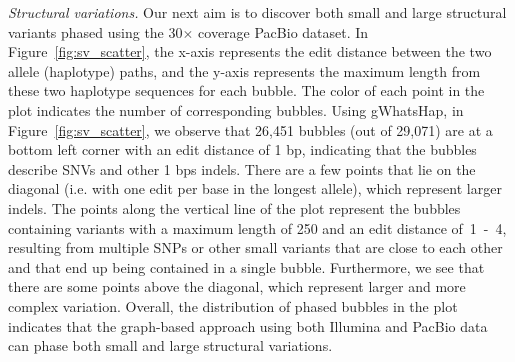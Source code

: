\textit{Structural variations.} Our next aim is to discover both small and large structural variants phased using the 30$\times$ coverage PacBio dataset.
In Figure~\ref{fig:sv_scatter}, the x-axis represents the edit distance between the two allele (haplotype) paths,
and the y-axis represents the maximum length from these two haplotype sequences for each bubble.
The color of each point in the plot indicates the number of corresponding bubbles.
Using gWhatsHap, in Figure~\ref{fig:sv_scatter}, we observe that 26,451 bubbles (out of 29,071) are at a bottom left corner with an edit distance of 1 bp, indicating that the bubbles describe SNVs and other 1 bps indels. 
There are a few points that lie on the diagonal (i.e. with one edit per base in the longest allele), which represent larger indels.
The points along the vertical line of the plot represent the bubbles containing variants with a maximum length of 250 and an edit distance of~1~-~4, 
resulting from multiple SNPs or other small variants that are close to each other and that end up being contained in a single bubble.
Furthermore, we see that there are some points above the diagonal, which represent larger and more complex variation.
Overall, the distribution of phased bubbles in the plot indicates that the graph-based approach using both Illumina and PacBio data can phase both small and large structural variations.


